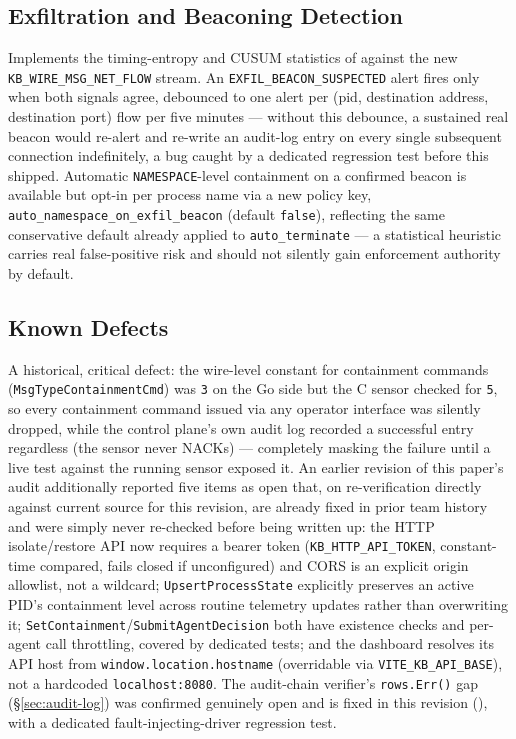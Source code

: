 \documentclass{article}
\begin{document}
\subsection{Exfiltration and Beaconing Detection}
\label{sec:exfil}

Implements the timing-entropy and CUSUM statistics of
 against the new
\texttt{KB\_WIRE\_MSG\_NET\_FLOW} stream. An
\texttt{EXFIL\_BEACON\_SUSPECTED} alert fires only when both signals
agree, debounced to one alert per (pid, destination address,
destination port) flow per five minutes --- without this debounce, a
sustained real beacon would re-alert and re-write an audit-log entry on
every single subsequent connection indefinitely, a bug caught by a
dedicated regression test before this shipped. Automatic
\texttt{NAMESPACE}-level containment on a confirmed beacon is available
but opt-in per process name via a new policy key,
\texttt{auto\_namespace\_on\_exfil\_beacon} (default \texttt{false}),
reflecting the same conservative default already applied to
\texttt{auto\_terminate} --- a statistical heuristic carries real
false-positive risk and should not silently gain enforcement authority
by default.

\subsection{Known Defects}

A historical, critical defect: the wire-level constant for containment
commands (\texttt{MsgTypeContainmentCmd}) was \texttt{3} on the Go side
but the C sensor checked for \texttt{5}, so every containment command
issued via any operator interface was silently dropped, while the
control plane's own audit log recorded a successful entry regardless
(the sensor never NACKs) --- completely masking the failure until a live
test against the running sensor exposed it. An earlier revision of this
paper's audit additionally reported five items as open that, on
re-verification directly against current source for this revision, are
already fixed in prior team history and were simply never re-checked
before being written up: the HTTP isolate/restore API now requires a
bearer token (\texttt{KB\_HTTP\_API\_TOKEN}, constant-time compared,
fails closed if unconfigured) and CORS is an explicit origin allowlist,
not a wildcard; \texttt{UpsertProcessState} explicitly preserves an
active PID's containment level across routine telemetry updates rather
than overwriting it; \texttt{SetContainment}/\texttt{SubmitAgentDecision}
both have existence checks and per-agent call throttling, covered by
dedicated tests; and the dashboard resolves its API host from
\texttt{window.location.hostname} (overridable via
\texttt{VITE\_KB\_API\_BASE}), not a hardcoded
\texttt{localhost:8080}. The audit-chain verifier's \texttt{rows.Err()}
gap (\S\ref{sec:audit-log}) was confirmed genuinely open and is fixed
in this revision (), with a dedicated
fault-injecting-driver regression test.
\end{document}

